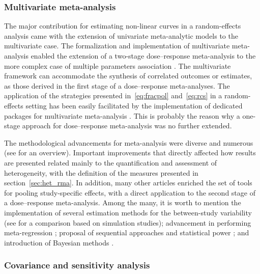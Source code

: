 \documentclass[11pt,a4paper,twoside,openany]{book}\usepackage{knitr}
\begin{document}
{{\subsubsection*{Multivariate meta-analysis}

The major contribution for estimating non-linear curves in a random-effects analysis came with the extension of univariate meta-analytic models to the multivariate case. The formalization and implementation of multivariate meta-analysis enabled the extension of a two-stage dose--response meta-analysis to the more complex case of multiple parameters association \citep{gasparrini2012multivariate}. The multivariate framework can accommodate the synthesis of correlated outcomes or estimates, as those derived in the first stage of a dose--response meta-analyses. The application of the strategies presented in~\ref{eq:fracpol} and~\ref{eq:rcs} in a random-effects setting has been easily facilitated by the implementation of dedicated packages for multivariate meta-analysis \citep{white2011multivariate, jackson2011multivariate}. This is probably the reason why a one-stage approach for dose--response meta-analysis was no further extended.

\noindent The methodological advancements for meta-analysis were diverse and numerous (see \cite{sutton2008recent} for an overview). Important improvements that directly affected how results are presented related mainly to the quantification and assessment of heterogeneity, with the definition of the measures presented in section~\ref{sec:het_rma}. In addition, many other articles enriched the set of tools for pooling study-specific effects, with a direct application to the second stage of a dose--response meta-analysis. Among the many, it is worth to mention the implementation of several estimation methods for the between-study variability (see \cite{langan2017comparative} for a comparison based on simulation studies); advancement in performing meta-regression \citep{van2002advanced}; proposal of sequential approaches \citep{pogue1997cumulating} and statistical power \citep{sutton2007evidence}; and introduction of Bayesian methods \citep{sutton2001bayesian}.

\subsubsection*{Covariance and sensitivity analysis}

}}
\end{document}
